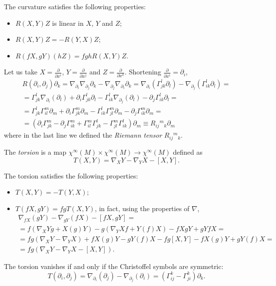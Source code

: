 \documentclass[a4paper,12pt]{book}
\begin{document}
The curvature satisfies the following properties:
\begin{itemize}
\item $R(X,Y)Z$ is linear in $X$, $Y$ and $Z$;
\item $R(X,Y)Z=-R(Y,X)Z$;
\item \leavevmode\par\vspace*{\dimexpr-4pt-\parskip-\baselineskip}
\begin{exercise}$R(fX,gY)(hZ)=fghR(X,Y)Z$.\end{exercise}
\end{itemize}

\begin{definition}
Let us take $X=\frac{\partial}{\partial x^i}$, $Y=\frac{\partial}{\partial x^j}$ and $Z=\frac{\partial}{\partial x^k}$. Shortening $\frac{\partial}{\partial x^i}=\partial_i$,
\begin{multline*}R(\partial_i,\partial_j)\partial_k=\nabla_{\partial_i}\nabla_{\partial_j}\partial_k-\nabla_{\partial_j}\nabla_{\partial_i}\partial_k=\nabla_{\partial_i}(\Gamma_{jk}^l\partial_l)-\nabla_{\partial_j}(\Gamma_{ik}^l\partial_l)=\\
=\Gamma_{jk}^l\nabla_{\partial_i}(\partial_l)+\partial_i\Gamma_{jk}^l\partial_l-\Gamma_{ik}^l\nabla_{\partial_j}(\partial_l)-\partial_j\Gamma_{ik}^l\partial_l=\\
=\Gamma_{jk}^l\Gamma_{il}^m\partial_m+\partial_i\Gamma_{jk}^m\partial_m-\Gamma_{ik}^l\Gamma_{jl}^m\partial_m-\partial_j\Gamma_{ik}^m\partial_m=\\
=(\partial_i\Gamma_{jk}^m-\partial_j\Gamma_{ik}^m+\Gamma_{il}^m\Gamma_{jk}^l-\Gamma_{jl}^m\Gamma_{ik}^l)\partial_m\equiv R_{ij}{}^m{}_k\partial_m\end{multline*}
where in the last line we defined the \emph{Riemann tensor} $R_{ij}{}^m{}_k$.
\end{definition}

\begin{definition}
The \emph{torsion} is a map $\chi^\infty(M)\times\chi^\infty(M)\to\chi^\infty(M)$ defined as
\[T(X,Y)=\nabla_XY-\nabla_YX-[X,Y].\]
\end{definition}
The torsion satisfies the following properties:
\begin{itemize}
\item $T(X,Y)=-T(Y,X)$;
\item $T(fX,gY)=fgT(X,Y)$, in fact, using the properties of $\nabla$,
\begin{multline*}
\nabla_{fX}(gY)-\nabla_{gY}(fX)-[fX,gY]=\\
=f(\nabla_XYg+X(g)Y)-g(\nabla_YXf+Y(f)X)-fXgY+gYfX=\\
=fg(\nabla_XY-\nabla_YX)+fX(g)Y-gY(f)X-fg[X,Y]-fX(g)Y+gY(f)X=\\
=fg(\nabla_XY-\nabla_YX-[X,Y]).
\end{multline*}
\end{itemize}
The torsion vanishes if and only if the Christoffel symbols are symmetric:
\[T(\partial_i,\partial_j)=\nabla_{\partial_i}(\partial_j)-\nabla_{\partial_j}(\partial_i)=(\Gamma_{ij}^k-\Gamma_{ji}^k)\partial_k.\]
\end{document}
